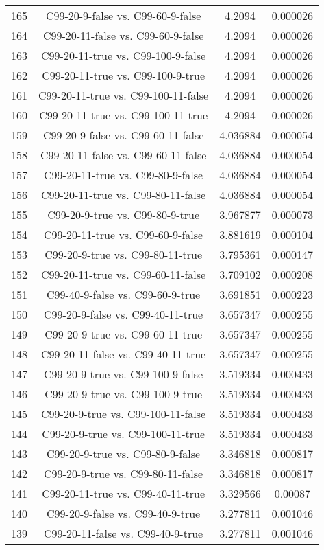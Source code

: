 \documentclass[a4paper,10pt]{article}
\begin{document}
\begin{landscape}
\begin{table}[!htp]
\begin{tabular}{cccc}
165&C99-20-9-false vs. C99-60-9-false&4.2094&0.000026\\
164&C99-20-11-false vs. C99-60-9-false&4.2094&0.000026\\
163&C99-20-11-true vs. C99-100-9-false&4.2094&0.000026\\
162&C99-20-11-true vs. C99-100-9-true&4.2094&0.000026\\
161&C99-20-11-true vs. C99-100-11-false&4.2094&0.000026\\
160&C99-20-11-true vs. C99-100-11-true&4.2094&0.000026\\
159&C99-20-9-false vs. C99-60-11-false&4.036884&0.000054\\
158&C99-20-11-false vs. C99-60-11-false&4.036884&0.000054\\
157&C99-20-11-true vs. C99-80-9-false&4.036884&0.000054\\
156&C99-20-11-true vs. C99-80-11-false&4.036884&0.000054\\
155&C99-20-9-true vs. C99-80-9-true&3.967877&0.000073\\
154&C99-20-11-true vs. C99-60-9-false&3.881619&0.000104\\
153&C99-20-9-true vs. C99-80-11-true&3.795361&0.000147\\
152&C99-20-11-true vs. C99-60-11-false&3.709102&0.000208\\
151&C99-40-9-false vs. C99-60-9-true&3.691851&0.000223\\
150&C99-20-9-false vs. C99-40-11-true&3.657347&0.000255\\
149&C99-20-9-true vs. C99-60-11-true&3.657347&0.000255\\
148&C99-20-11-false vs. C99-40-11-true&3.657347&0.000255\\
147&C99-20-9-true vs. C99-100-9-false&3.519334&0.000433\\
146&C99-20-9-true vs. C99-100-9-true&3.519334&0.000433\\
145&C99-20-9-true vs. C99-100-11-false&3.519334&0.000433\\
144&C99-20-9-true vs. C99-100-11-true&3.519334&0.000433\\
143&C99-20-9-true vs. C99-80-9-false&3.346818&0.000817\\
142&C99-20-9-true vs. C99-80-11-false&3.346818&0.000817\\
141&C99-20-11-true vs. C99-40-11-true&3.329566&0.00087\\
140&C99-20-9-false vs. C99-40-9-true&3.277811&0.001046\\
139&C99-20-11-false vs. C99-40-9-true&3.277811&0.001046\\

\end{tabular}
\end{table}
\end{landscape}
\end{document}
